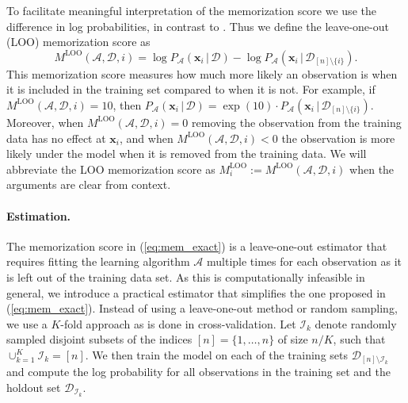 \documentclass{article}
\newcommand{\bft}[1]{\mathbf{#1}}
\newcommand{\given}{\,|\,}
\begin{document}
To facilitate meaningful interpretation of the memorization score we use the 
difference in log probabilities, in contrast to 
\cite{feldman2019does,feldman2020what}. Thus we define the leave-one-out (LOO) 
memorization score as
\begin{equation}
	\label{eq:mem_exact}
	M^{\text{LOO}}(\mathcal{A}, \mathcal{D}, i) = \log 
	P_{\mathcal{A}}(\bft{x}_i \given \mathcal{D}) - \log 
	P_{\mathcal{A}}(\bft{x}_i \given \mathcal{D}_{[n] \setminus \{i\}}).
\end{equation}
This memorization score measures how much more likely an observation is when 
it is included in the training set compared to when it is not. For example, if 
$M^{\text{LOO}}(\mathcal{A}, \mathcal{D}, i) = 10$, then 
$P_{\mathcal{A}}(\bft{x}_i \given \mathcal{D}) = \exp(10) \cdot 
P_{\mathcal{A}}(\bft{x}_i \given \mathcal{D}_{[n] \setminus \{i\}})$.  
Moreover, when $M^{\text{LOO}}(\mathcal{A}, \mathcal{D}, i) = 0$ removing the 
observation from the training data has no effect at $\bft{x}_i$, and when 
$M^{\text{LOO}}(\mathcal{A}, \mathcal{D}, i) < 0$ the observation is more 
likely under the model when it is removed from the training data. We will 
abbreviate the LOO memorization score as $M^{\text{LOO}}_i := 
M^{\text{LOO}}(\mathcal{A}, \mathcal{D}, i)$ when the arguments are clear from 
context.

\paragraph{Estimation.} The memorization score in (\ref{eq:mem_exact}) is a 
leave-one-out estimator that requires fitting the learning algorithm 
$\mathcal{A}$ multiple times for each observation as it is left out of the 
training data set. As this is computationally infeasible in general, we 
introduce a practical estimator that simplifies the one proposed in 
(\ref{eq:mem_exact}). Instead of using a leave-one-out method or random 
sampling, we use a $K$-fold approach as is done in cross-validation.  Let 
$\mathcal{I}_k$ denote randomly sampled disjoint subsets of the indices $[n] = 
\{1,\ldots,n\}$ of size $n / K$, such that $\cup_{k=1}^K \mathcal{I}_k = [n]$.  
We then train the model on each of the training sets $\mathcal{D}_{[n] 
	\setminus \mathcal{I}_k}$ and compute the log probability for all 
observations in the training set and the holdout set 
$\mathcal{D}_{\mathcal{I}_k}$.
\end{document}
